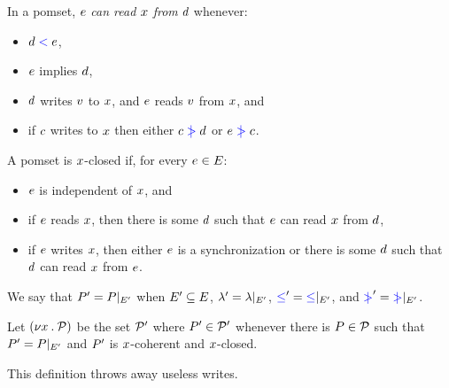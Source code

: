 \begin{definition}\label{def:rf}
  In a pomset, $e$ \emph{can read $x$ from} $d$ whenever: 
  \begin{itemize}
  \item $d \mathrel{{\color{blue}<}} e$,  
  \item $e$ implies $d$,
  \item $d$ writes $v$ to $x$,
    and $e$ reads $v$ from $x$, and
  \item if $c$ writes to $x$
    then either $c \mathrel{{\color{blue}\mkern4mu\mid\!\!\!>}} d$ or $e \mathrel{{\color{blue}\mkern4mu\mid\!\!\!>}} c$.
  \end{itemize}
\end{definition}


\begin{definition}
\label{def:x-closed}
A pomset is $x$-closed if, for every $e\in E$:
  \begin{itemize}
  \item $e$ is independent of $x$, and
  \item if $e$ reads $x$, then there is some $d$ such that $e$
    can read $x$ from $d$,
  \item if $e$ writes $x$, then either $e$ is a synchronization or there is
    some $d$ such that $d$ can read $x$ from $e$.
  \end{itemize}
\end{definition}

We say that $P' = P\mathbin{|}_{E'}$ when 
 $E' \subseteq E$,
 ${\lambda'} = {\lambda}\mathbin{|}_{E'}$, 
 ${\mathrel{{\color{blue}\leq}}'} = {\mathrel{{\color{blue}\leq}}}\mathbin{|}_{E'}$, and
 ${\mathrel{{\color{blue}\mkern4mu\mid\!\!\!>}}'} = {\mathrel{{\color{blue}\mkern4mu\mid\!\!\!>}}}\mathbin{|}_{E'}$.

\begin{definition}
  Let $(\nu x\mathbin.\mathcal{P})$ be the set $\mathcal{P}'$ where $P'\in\mathcal{P}'$
  whenever there is $P\in\mathcal{P}$ such that $P' = P\mathbin{|}_{E'}$
  and $P'$ is $x$-coherent and $x$-closed.
\end{definition}
This definition throws away useless writes.

